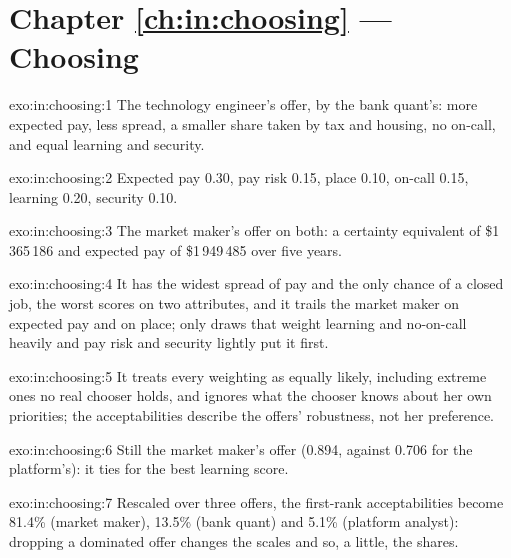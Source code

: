 \section*{Chapter \ref{ch:in:choosing} --- Choosing}

\begin{solution}{exo:in:choosing:1}
The technology engineer's offer, by the bank quant's: more expected pay, less spread, a smaller share taken by tax and
housing, no on-call, and equal learning and security.
\end{solution}

\begin{solution}{exo:in:choosing:2}
Expected pay 0.30, pay risk 0.15, place 0.10, on-call 0.15, learning 0.20, security 0.10.
\end{solution}

\begin{solution}{exo:in:choosing:3}
The market maker's offer on both: a certainty equivalent of \$1\,365\,186 and expected pay of \$1\,949\,485 over five
years.
\end{solution}

\begin{solution}{exo:in:choosing:4}
It has the widest spread of pay and the only chance of a closed job, the worst scores on two attributes, and it trails the
market maker on expected pay and on place; only draws that weight learning and no-on-call heavily and pay risk and
security lightly put it first.
\end{solution}

\begin{solution}{exo:in:choosing:5}
It treats every weighting as equally likely, including extreme ones no real chooser holds, and ignores what the chooser
knows about her own priorities; the acceptabilities describe the offers' robustness, not her preference.
\end{solution}

\begin{solution}{exo:in:choosing:6}
Still the market maker's offer (0.894, against 0.706 for the platform's): it ties for the best learning score.
\end{solution}

\begin{solution}{exo:in:choosing:7}
Rescaled over three offers, the first-rank acceptabilities become 81.4\% (market maker), 13.5\% (bank quant) and 5.1\%
(platform analyst): dropping a dominated offer changes the scales and so, a little, the shares.
\end{solution}

